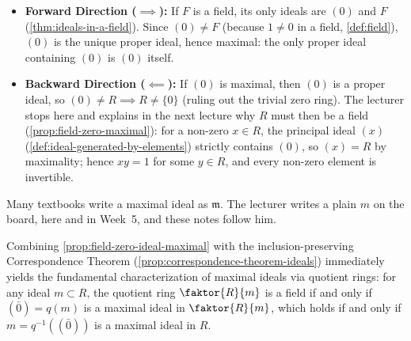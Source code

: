 \begin{content}

\begin{steps}
\begin{itemize}
    \item \textbf{Forward Direction ($\implies$):} If $F$ is a field, its only ideals are $(0)$ and $F$ (\cref{thm:ideals-in-a-field}). Since $(0) \neq F$ (because $1 \neq 0$ in a field, \cref{def:field}), $(0)$ is the unique proper ideal, hence maximal: the only proper ideal containing $(0)$ is $(0)$ itself.
    \item \textbf{Backward Direction ($\impliedby$):} If $(0)$ is maximal, then $(0)$ is a proper ideal, so $(0) \neq R \implies R \neq \{0\}$ (ruling out the trivial zero ring). The lecturer stops here and explains in the next lecture why $R$ must then be a field (\cref{prop:field-zero-maximal}): for a non-zero $x \in R$, the principal ideal $(x)$ (\cref{def:ideal-generated-by-elements}) strictly contains $(0)$, so $(x) = R$ by maximality; hence $x y = 1$ for some $y \in R$, and every non-zero element is invertible.
\end{itemize}
\end{steps}
\end{content}

\begin{aiNote}
Many textbooks write a maximal ideal as $\mathfrak{m}$. The lecturer writes a plain $m$ on the board, here and in Week~5, and these notes follow him.
\end{aiNote}

\begin{aiNote}
Combining \cref{prop:field-zero-ideal-maximal} with the inclusion-preserving Correspondence Theorem (\cref{prop:correspondence-theorem-ideals}) immediately yields the fundamental characterization of maximal ideals via quotient rings: for any ideal $m \subset R$, the quotient ring $\faktor{R}{m}$ is a field if and only if $(\bar{0}) = q(m)$ is a maximal ideal in $\faktor{R}{m}$, which holds if and only if $m = q^{-1}((\bar{0}))$ is a maximal ideal in $R$.
\end{aiNote}


